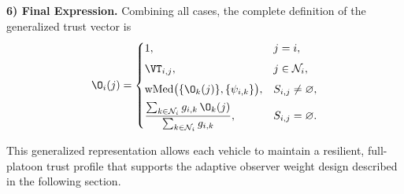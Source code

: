 
\vspace{1ex}
\noindent\textbf{6) Final Expression.}
Combining all cases, the complete definition of the generalized trust vector is
\begin{equation}
\O_i(j) =
\begin{cases}
1, & j = i,\\[1ex]
\VT_{i,j}, & j \in \mathcal{N}_i,\\[1ex]
\operatorname{wMed}\bigl(\{\O_k(j)\}, \{\psi_{i,k}\}\bigr),
& S_{i,j} \neq \varnothing,\\[1ex]
\displaystyle
\frac{\sum_{k\in\mathcal{N}_i} g_{i,k} \, \O_k(j)}{\sum_{k\in\mathcal{N}_i} g_{i,k}},
& S_{i,j} = \varnothing.
\end{cases}
\label{eq:final_trust_vector}
\end{equation}

This generalized representation allows each vehicle to maintain a resilient, full-platoon trust profile that supports the adaptive observer weight design described in the following section.

